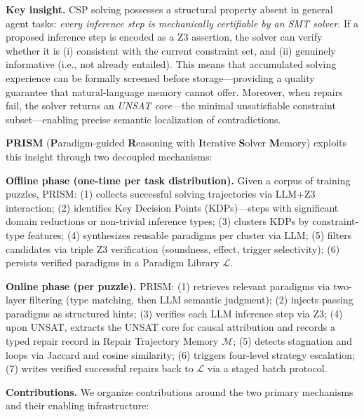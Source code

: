 \textbf{Key insight.} CSP solving possesses a structural property absent in general agent tasks: \textit{every inference step is mechanically certifiable by an SMT solver}. If a proposed inference step is encoded as a Z3 assertion, the solver can verify whether it is (i) consistent with the current constraint set, and (ii) genuinely informative (i.e., not already entailed). This means that accumulated solving experience can be formally screened before storage—providing a quality guarantee that natural-language memory cannot offer. Moreover, when repairs fail, the solver returns an \textit{UNSAT core}—the minimal unsatisfiable constraint subset—enabling precise semantic localization of contradictions.

\textbf{PRISM} (\textbf{P}aradigm-guided \textbf{R}easoning with \textbf{I}terative \textbf{S}olver \textbf{M}emory) exploits this insight through two decoupled mechanisms:

\textbf{Offline phase (one-time per task distribution).} Given a corpus of training puzzles, PRISM: (1) collects successful solving trajectories via LLM+Z3 interaction; (2) identifies Key Decision Points (KDPs)—steps with significant domain reductions or non-trivial inference types; (3) clusters KDPs by constraint-type features; (4) synthesizes reusable paradigms per cluster via LLM; (5) filters candidates via triple Z3 verification (soundness, effect, trigger selectivity); (6) persists verified paradigms in a Paradigm Library $\mathcal{L}$.

\textbf{Online phase (per puzzle).} PRISM: (1) retrieves relevant paradigms via two-layer filtering (type matching, then LLM semantic judgment); (2) injects passing paradigms as structured hints; (3) verifies each LLM inference step via Z3; (4) upon UNSAT, extracts the UNSAT core for causal attribution and records a typed repair record in Repair Trajectory Memory $\mathcal{M}$; (5) detects stagnation and loops via Jaccard and cosine similarity; (6) triggers four-level strategy escalation; (7) writes verified successful repairs back to $\mathcal{L}$ via a staged batch protocol.

\textbf{Contributions.} We organize contributions around the two primary mechanisms and their enabling infrastructure:

